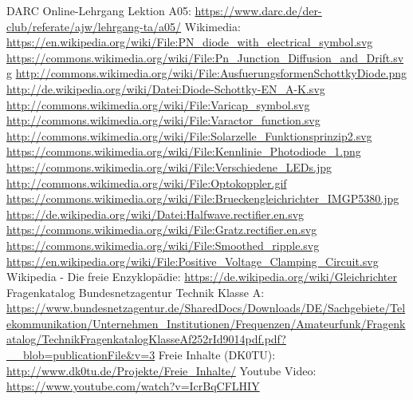 \begin{thebibliography}{}
      DARC Online-Lehrgang Lektion A05:
                    \url{https://www.darc.de/der-club/referate/ajw/lehrgang-ta/a05/}
     	Wikimedia:
                    \url{https://en.wikipedia.org/wiki/File:PN_diode_with_electrical_symbol.svg}
                    \url{https://commons.wikimedia.org/wiki/File:Pn_Junction_Diffusion_and_Drift.svg}
                    \url{http://commons.wikimedia.org/wiki/File:AusfuerungsformenSchottkyDiode.png}
                    \url{http://de.wikipedia.org/wiki/Datei:Diode-Schottky-EN_A-K.svg}
                    \url{http://commons.wikimedia.org/wiki/File:Varicap_symbol.svg}
                    \url{http://commons.wikimedia.org/wiki/File:Varactor_function.svg}
                    \url{http://commons.wikimedia.org/wiki/File:Solarzelle_Funktionsprinzip2.svg}
                    \url{https://commons.wikimedia.org/wiki/File:Kennlinie_Photodiode_1.png}
                    \url{https://commons.wikimedia.org/wiki/File:Verschiedene_LEDs.jpg}
                    \url{http://commons.wikimedia.org/wiki/File:Optokoppler.gif}
                    \url{https://commons.wikimedia.org/wiki/File:Brueckengleichrichter_IMGP5380.jpg}
                    \url{https://de.wikipedia.org/wiki/Datei:Halfwave.rectifier.en.svg}
                    \url{https://commons.wikimedia.org/wiki/File:Gratz.rectifier.en.svg}
                    \url{https://commons.wikimedia.org/wiki/File:Smoothed_ripple.svg}
                    \url{https://en.wikipedia.org/wiki/File:Positive_Voltage_Clamping_Circuit.svg}
                    \url{}
                    \url{}
        Wikipedia - Die freie Enzyklopädie:
                    \url{https://de.wikipedia.org/wiki/Gleichrichter}
	   Fragenkatalog Bundesnetzagentur Technik Klasse A:                   
                    \url{https://www.bundesnetzagentur.de/SharedDocs/Downloads/DE/Sachgebiete/Telekommunikation/Unternehmen_Institutionen/Frequenzen/Amateurfunk/Fragenkatalog/TechnikFragenkatalogKlasseAf252rId9014pdf.pdf?__blob=publicationFile&v=3}
        Freie Inhalte (DK0TU):
                    \url{http://www.dk0tu.de/Projekte/Freie_Inhalte/}
         Youtube Video:                   
                    \url{https://www.youtube.com/watch?v=IcrBqCFLHIY}
\end{thebibliography} 


